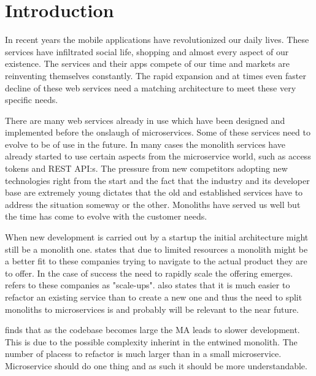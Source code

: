 

\section{Introduction}
\begin{sloppypar}
    In recent years the mobile applications have revolutionized our daily lives. 
    These services have infiltrated social life, shopping and almost every 
    aspect of our existence. The services and their apps compete of our time and
    markets are reinventing themselves constantly. The rapid expansion and at 
    times even faster decline of these web services need a matching architecture 
    to meet these very specific needs. 
\end{sloppypar}
\begin{sloppypar}
    There are many web services already in use which have been designed and 
    implemented before the onslaugh of microservices. Some of these services 
    need to evolve to be of use in the future. In many cases the monolith 
    services have already started to use certain aspects from the microservice 
    world, such as access tokens and REST API:s. The pressure from new 
    competitors adopting new technologies right from the start and the fact 
    that the industry and its developer base are extremely young dictates that 
    the old and established services have to address the situation someway or 
    the other. Monoliths have served us well but the time has come to evolve 
    with the customer needs.
\end{sloppypar}
\begin{sloppypar}
    When new development is carried out by a startup the initial architecture 
    might still be a monolith one. \citet{newman2019} states that due to limited 
    resources a monolith might be a better fit to these companies trying to 
    navigate to the actual product they are to offer. In the case of success 
    the need to rapidly scale the offering emerges. \citet{newman2019} refers 
    to these companies as "scale-ups". \citet{newman2019} also states that it 
    is much easier to refactor an existing service than to create a new one and
    thus the need to split monoliths to microservices is and probably will be 
    relevant to the near future.
\end{sloppypar}
\begin{sloppypar}
    \citet{10.1007/978-3-319-74433-9_3} finds that as the codebase becomes large 
    the MA leads to slower development. This is due to the possible complexity
    inherint in the entwined monolith. The number of placess to refactor is much 
    larger than in a small microservice. Microservice should do one thing and as 
    such it should be more understandable.
\end{sloppypar} 
